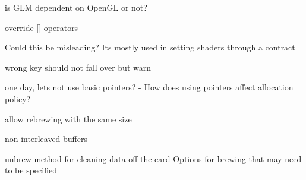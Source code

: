 
\begin{DoxyRefList}
\item[\label{todo__todo000037}%
\hypertarget{todo__todo000037}{}%
Namespace \hyperlink{namespaces9}{s9} ]is G\-L\-M dependent on Open\-G\-L or not?  
\item[\label{todo__todo000018}%
\hypertarget{todo__todo000018}{}%
Class \hyperlink{classs9_1_1AllocationPolicyNew}{s9\-:\-:Allocation\-Policy\-New} ]override \mbox{[}\mbox{]} operators  
\item[\label{todo__todo000014}%
\hypertarget{todo__todo000014}{}%
Member \hyperlink{classs9_1_1Camera_aad4cde7320e0a12e13453bd5f4cef494}{s9\-:\-:Camera\-:\-:view\-\_\-matrix} ()]Could this be misleading? Its mostly used in setting shaders through a contract  
\item[\label{todo__todo000017}%
\hypertarget{todo__todo000017}{}%
Member \hyperlink{classs9_1_1compvis_1_1ProcessBlock_a2189359475f02db5e99e699a4a9a5fa0}{s9\-:\-:compvis\-:\-:Process\-Block\-:\-:get\-Value} (std\-::string tag)]wrong key should not fall over but warn  
\item[\label{todo__todo000019}%
\hypertarget{todo__todo000019}{}%
Member \hyperlink{classs9_1_1GeometryT_acde81a6b14f995e64ec5480dc1c3ad83}{s9\-:\-:Geometry\-T$<$ Vertex\-Type, Face\-Type, Allocation\-Policy $>$\-:\-:indices} () const ]one day, lets not use basic pointers? -\/ How does using pointers affect allocation policy?  
\item[\label{todo__todo000023}%
\hypertarget{todo__todo000023}{}%
Member \hyperlink{classs9_1_1gl_1_1Drawable_ac45a196466c96705860cff9f8898673f}{s9\-:\-:gl\-:\-:Drawable\-:\-:brew} (Geometry\-T$<$ Vertex\-Type, Face\-Type, Allocation\-Policy $>$ \&g, Brew\-Flags b=Brew\-Flags\-Default)]allow rebrewing with the same size 

non interleaved buffers  
\item[\label{todo__todo000021}%
\hypertarget{todo__todo000021}{}%
Member \hyperlink{classs9_1_1gl_1_1Drawable_a17009f367a17d45ac7f9245b15229c95}{s9\-:\-:gl\-:\-:Drawable\-:\-:draw} (Geometry\-T$<$ Vertex\-Type, Face\-Type, Allocation\-Policy $>$ \&g, Geometry\-Primitive gp)]unbrew method for cleaning data off the card Options for brewing that may need to be specified 


\end{DoxyRefList}
